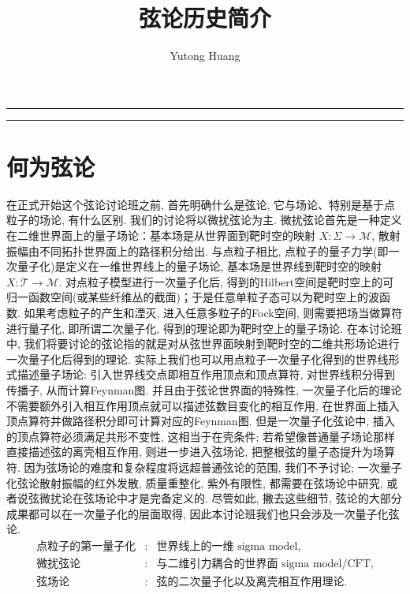 \documentclass[10pt]{article}
\title{\boldmath 弦论历史简介}
\author{ Yutong Huang}
\newcounter{ex}[section]\setcounter{ex}{0}
\numberwithin{equation}{section}
\begin{document}
\maketitle


\hrule

\tableofcontents

\vspace{2em}
\hrule

\newpage



\section{何为弦论}

在正式开始这个弦论讨论班之前, 首先明确什么是弦论, 它与场论、特别是基于点粒子的场论, 有什么区别. 我们的讨论将以微扰弦论为主. 
微扰弦论首先是一种定义在二维世界面上的量子场论：基本场是从世界面到靶时空的映射 $X:\Sigma\to\mathcal M$, 散射振幅由不同拓扑世界面上的路径积分给出.
与点粒子相比, 点粒子的量子力学(即一次量子化)是定义在一维世界线上的量子场论, 基本场是世界线到靶时空的映射 $X:\mathcal{T}\to\mathcal M$.
对点粒子模型进行一次量子化后, 得到的Hilbert空间是靶时空上的可归一函数空间(或某些纤维丛的截面)；于是任意单粒子态可以为靶时空上的波函数.
如果考虑粒子的产生和湮灭, 进入任意多粒子的Fock空间, 则需要把场当做算符进行量子化, 即所谓二次量子化, 得到的理论即为靶时空上的量子场论.
在本讨论班中, 我们将要讨论的弦论指的就是对从弦世界面映射到靶时空的二维共形场论进行一次量子化后得到的理论.
实际上我们也可以用点粒子一次量子化得到的世界线形式描述量子场论: 引入世界线交点即相互作用顶点和顶点算符, 对世界线积分得到传播子, 从而计算Feynman图.
并且由于弦论世界面的特殊性, 一次量子化后的理论不需要额外引入相互作用顶点就可以描述弦数目变化的相互作用, 在世界面上插入顶点算符并做路径积分即可计算对应的Feynman图. 
但是一次量子化弦论中, 插入的顶点算符必须满足共形不变性, 这相当于在壳条件; 若希望像普通量子场论那样直接描述弦的离壳相互作用, 则进一步进入弦场论, 把整根弦的量子态提升为场算符.
因为弦场论的难度和复杂程度将远超普通弦论的范围, 我们不予讨论; 一次量子化弦论散射振幅的红外发散, 质量重整化, 紫外有限性, 都需要在弦场论中研究, 或者说弦微扰论在弦场论中才是完备定义的. 
尽管如此, 撇去这些细节, 弦论的大部分成果都可以在一次量子化的层面取得, 因此本讨论班我们也只会涉及一次量子化弦论.
\begin{equation}
\begin{array}{ccl}
\text{点粒子的第一量子化} &:& \text{世界线上的一维 sigma model},\\
\text{微扰弦论} &:& \text{与二维引力耦合的世界面 sigma model/CFT},\\
\text{弦场论} &:& \text{弦的二次量子化以及离壳相互作用理论}.
\end{array}
\end{equation}
\end{document}
